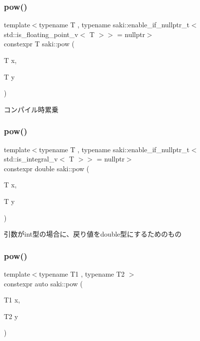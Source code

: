 \subsubsection{\texorpdfstring{pow()}{pow()}\hspace{0.1cm}{\footnotesize\ttfamily [1/3]}}
{\footnotesize\ttfamily template$<$typename T , typename saki\+::enable\+\_\+if\+\_\+nullptr\+\_\+t$<$ std\+::is\+\_\+floating\+\_\+point\+\_\+v$<$ T $>$$>$  = nullptr$>$ \\
constexpr T saki\+::pow (\begin{DoxyParamCaption}\item[{T}]{x,  }\item[{T}]{y }\end{DoxyParamCaption})}



コンパイル時累乗 

\mbox{\label{namespacesaki_a53b0e93733e85d7c6ab17aea25072536}} 
\subsubsection{\texorpdfstring{pow()}{pow()}\hspace{0.1cm}{\footnotesize\ttfamily [2/3]}}
{\footnotesize\ttfamily template$<$typename T , typename saki\+::enable\+\_\+if\+\_\+nullptr\+\_\+t$<$ std\+::is\+\_\+integral\+\_\+v$<$ T $>$$>$  = nullptr$>$ \\
constexpr double saki\+::pow (\begin{DoxyParamCaption}\item[{T}]{x,  }\item[{T}]{y }\end{DoxyParamCaption})}



引数がint型の場合に、戻り値をdouble型にするためのもの 

\mbox{\label{namespacesaki_aede1168d9c20adf475c0a27670925c34}} 
\subsubsection{\texorpdfstring{pow()}{pow()}\hspace{0.1cm}{\footnotesize\ttfamily [3/3]}}
{\footnotesize\ttfamily template$<$typename T1 , typename T2 $>$ \\
constexpr auto saki\+::pow (\begin{DoxyParamCaption}\item[{T1}]{x,  }\item[{T2}]{y }\end{DoxyParamCaption})}



